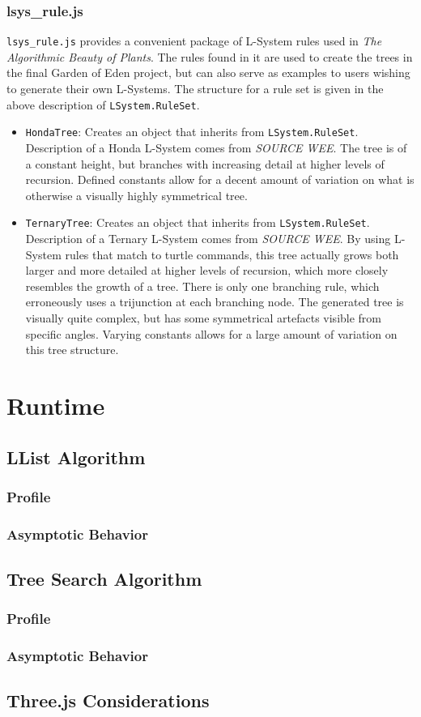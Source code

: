 \documentclass{article}
\newcommand{\tab}{\hspace*{2em}}
\begin{document}
            \subsubsection{lsys\_rule.js}
    \tab \verb|lsys_rule.js| provides a convenient package of L-System rules used in \emph{The
Algorithmic Beauty of Plants}. The rules found in it are used to create the trees in the final
Garden of Eden project, but can also serve as examples to users wishing to generate their own
L-Systems. The structure for a rule set is given in the above description of
\verb|LSystem.RuleSet|.
    \begin{itemize}
        \item \verb|HondaTree|: Creates an object that inherits from \verb|LSystem.RuleSet|.
Description of a Honda L-System comes from \emph{SOURCE WEE}. The tree is of a constant height, but
branches with increasing detail at higher levels of recursion. Defined constants allow for a
decent amount of variation on what is otherwise a visually highly symmetrical tree.

        \item \verb|TernaryTree|: Creates an object that inherits from \verb|LSystem.RuleSet|.
Description of a Ternary L-System comes from \emph{SOURCE WEE}. By using L-System rules that match
to turtle commands, this tree actually grows both larger and more detailed at higher levels of
recursion, which more closely resembles the growth of a tree. There is only one branching rule,
which erroneously uses a trijunction at each branching node. The generated tree is visually quite
complex, but has some symmetrical artefacts visible from specific angles. Varying constants allows
for a large amount of variation on this tree structure.

    \end{itemize}

    \section{Runtime}
        \subsection{LList Algorithm}
            \subsubsection{Profile}
            \subsubsection{Asymptotic Behavior}
        \subsection{Tree Search Algorithm}
            \subsubsection{Profile}
            \subsubsection{Asymptotic Behavior}
        \subsection{Three.js Considerations}
\end{document}
